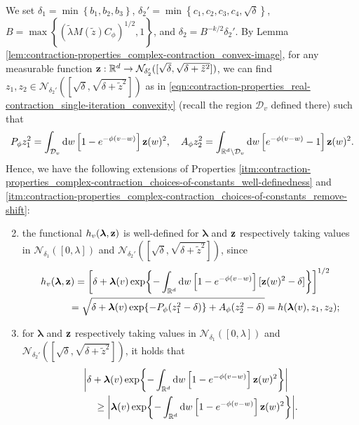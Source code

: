 \documentclass[11pt]{article}
\newcommand{\R}{\mathbb R}
\newcommand{\bl}{\bm{\lambda}}
\newcommand{\bz}{\vb{z}}
\newcommand{\tl}{\tilde{\lambda}}
\newcommand{\tz}{\tilde{z}}
\newcommand{\aconst}{A_{\phi}}
\newcommand{\pconst}{P_{\phi}}
\newcommand{\set}[1]{\left\{#1\right\}}
\numberwithin{equation}{section}
\theoremstyle{plain}
\theoremstyle{definition}
\theoremstyle{remark}
\begin{document}
We set $\delta_{1}=\min\set{b_{1},b_{2},b_{3}}$, $\delta_{2}'=\min\set{c_{1},c_{2},c_{3},c_{4},\sqrt{\delta}}$, $B=\max\set{(\tl M(\tz)C_{\phi})^{1/2},1}$, and $\delta_{2}=B^{-k/2}\delta_{2}'$.
By Lemma \ref{lem:contraction-properties_complex-contraction_convex-image}, for any measurable function $\bz:\R^{d}\rightarrow\mathcal{N}_{\delta_{2}'}([\sqrt{\delta},\sqrt{\delta+\tz^{2}}])$, we can find $z_{1},z_{2}\in\mathcal{N}_{\delta_{2}'}([\sqrt{\delta},\sqrt{\delta+\tz^{2}}])$ as in \eqref{eqn:contraction-properties_real-contraction_single-iteration_convexity} (recall the region $\mathcal{D}_{v}$ defined there) such that
\begin{equation}
\pconst z_{1}^{2}=\int_{\mathcal{D}_{v}}\dd{w}\left[1-e^{-\phi(v-w)}\right]\bz(w)^{2}, \quad
\aconst z_{2}^{2}=\int_{\R^{d}\setminus\mathcal{D}_{v}}\dd{w}\left[e^{-\phi(v-w)}-1\right]\bz(w)^{2}.
\end{equation}
Hence, we have the following extensions of Properties \ref{itm:contraction-properties_complex-contraction_choices-of-constants_well-definedness} and \ref{itm:contraction-properties_complex-contraction_choices-of-constants_remove-shift}:
\begin{enumerate}[label=(\roman*')]
\setcounter{enumi}{1}
\item the functional $h_{v}(\bl,\bz)$ is well-defined for $\bl$ and $\bz$ respectively taking values in $\mathcal{N}_{\delta_{1}}([0,\lambda])$ and $\mathcal{N}_{\delta_{2}'}([\sqrt{\delta},\sqrt{\delta+\tz^{2}}])$, since
\begin{equation}
\begin{multlined}
h_{v}(\bl,\bz)=\left[\delta+\bl(v)\exp{-\int_{\R^{d}}\dd{w}\left[1-e^{-\phi(v-w)}\right][\bz(w)^{2}-\delta]}\right]^{1/2}
\\
=\sqrt{\delta+\bl(v)\exp{-\pconst(z_{1}^{2}-\delta)}+\aconst(z_{2}^{2}-\delta)}
=h(\bl(v),z_{1},z_{2});
\end{multlined}
\end{equation}
\label{itm:contraction-properties_complex-contraction_choices-of-constants_function-well-definedness}
\setcounter{enumi}{3}
\item for $\bl$ and $\bz$ respectively taking values in $\mathcal{N}_{\delta_{1}}([0,\lambda])$ and $\mathcal{N}_{\delta_{2}'}([\sqrt{\delta},\sqrt{\delta+\tz^{2}}])$, it holds that
\begin{equation}
\begin{multlined}
\abs{\delta+\bl(v)\exp{-\int_{\R^{d}}\dd{w}\left[1-e^{-\phi(v-w)}\right]\bz(w)^{2}}}
\\
\ge\abs{\bl(v)\exp{-\int_{\R^{d}}\dd{w}\left[1-e^{-\phi(v-w)}\right]\bz(w)^{2}}}.
\end{multlined}
\end{equation}
\label{itm:contraction-properties_complex-contraction_choices-of-constants_function-remove-shift}
\end{enumerate}
\end{document}
